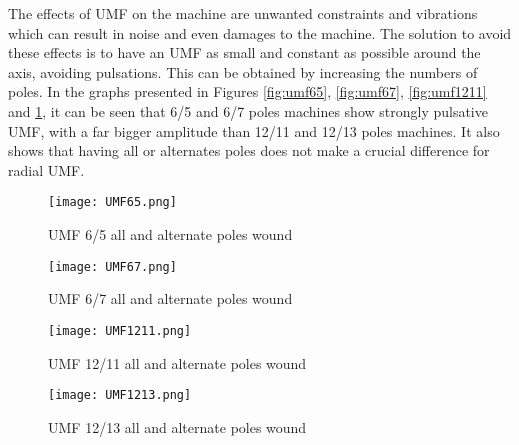 The effects of UMF on the machine are unwanted constraints and vibrations which can result in noise and even damages to the machine. The solution to avoid these effects is to have an UMF as small and constant as possible around the axis, avoiding pulsations. This can be obtained by increasing the numbers of poles. In the graphs presented in Figures \ref{fig:umf65}, \ref{fig:umf67}, \ref{fig:umf1211} and \ref{fig:umf1213}, it can be seen that 6/5 and 6/7 poles machines show strongly pulsative UMF, with a far bigger amplitude than 12/11 and 12/13 poles machines. It also shows that having all or alternates poles does not make a crucial difference for radial UMF. 
\begin{figure}
    \centering
    \texttt{[image: UMF65.png]}
    \caption{UMF 6/5 all and alternate poles wound}
    \label{fig:umf65}
    \texttt{[image: UMF67.png]}
    \caption{UMF 6/7 all and alternate poles wound}
    \label{fig:umf67}
    \centering
    \texttt{[image: UMF1211.png]}
    \caption{UMF 12/11 all and alternate poles wound}
    \label{fig:umf1211}
    \texttt{[image: UMF1213.png]}
    \caption{UMF 12/13 all and alternate poles wound}
    \label{fig:umf1213}
\end{figure}
